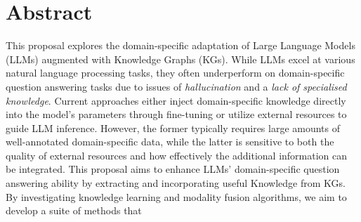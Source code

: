 \section*{Abstract}
This proposal explores the domain-specific adaptation of Large Language Models (LLMs) augmented with Knowledge Graphs (KGs). 
While LLMs excel at various natural language processing tasks, they often underperform on domain-specific question answering tasks due to issues of \emph{hallucination} and a \emph{lack of specialised knowledge}. 
Current approaches either inject domain-specific knowledge directly into the model's parameters through fine-tuning or utilize external resources to guide LLM inference. 
However, the former typically requires large amounts of well-annotated domain-specific data, while the latter is sensitive to both the quality of external resources and how effectively the additional information can be integrated. 
This proposal aims to enhance LLMs' domain-specific question answering ability by extracting and incorporating useful Knowledge from KGs. 
By investigating knowledge learning and modality fusion algorithms, we aim to develop a suite of methods that 
